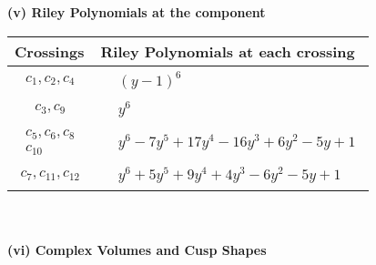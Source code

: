 \documentclass[1p]{elsarticle_modified}
\theoremstyle{definition}
\begin{document}
\newpage\renewcommand{\arraystretch}{1}
\flushleft \textbf{(v) Riley Polynomials at the component}\newline \\
\begin{tabular}{m{50pt}|m{274pt}}
Crossings & \hspace{64pt}Riley Polynomials at each crossing \\
\hline $$\begin{aligned}c_{1},c_{2},c_{4}\end{aligned}$$&$\begin{aligned}
&(y-1)^6
\end{aligned}$\\
\hline $$\begin{aligned}c_{3},c_{9}\end{aligned}$$&$\begin{aligned}
&y^6
\end{aligned}$\\
\hline $$\begin{aligned}c_{5},c_{6},c_{8}\\c_{10}\end{aligned}$$&$\begin{aligned}
&y^6-7 y^5+17 y^4-16 y^3+6 y^2-5 y+1
\end{aligned}$\\
\hline $$\begin{aligned}c_{7},c_{11},c_{12}\end{aligned}$$&$\begin{aligned}
&y^6+5 y^5+9 y^4+4 y^3-6 y^2-5 y+1
\end{aligned}$\\
\hline
\end{tabular}\\~\\
\newpage\flushleft \textbf{(vi) Complex Volumes and Cusp Shapes}
\end{document}

